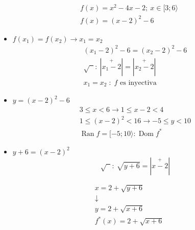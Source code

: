 \documentclass[11pt,a4paper]{article}
\begin{document}
\begin{minipage}[t]{0.380\textwidth}\small
\begin{gather*}
f(x) = x^2 - 4x - 2;\ x \in [3; 6\rangle\\
f(x) = (x-2)^2 - 6
\end{gather*}
\begin{itemize}
  \item $f(x_1) = f(x_2) \rightarrow x_1 = x_2$
  \begin{gather*}
  (x_1 - 2)^2 - 6 = (x_2 - 2)^2 - 6\\
  \sqrt{\phantom{x}}:\ |\overset{+}{x_1 - 2}| = |\overset{+}{x_2 - 2}|\\
  x_1 = x_2 \;:\; f \text{ es inyectiva}
  \end{gather*}
\end{itemize}
\begin{center}
\end{center}
\end{minipage}\hfill
\begin{minipage}[t]{0.330\textwidth}\small
\begin{itemize}
  \item $y = (x-2)^2 - 6$
  \begin{gather*}
  3 \leq x < 6 \rightarrow 1 \leq x - 2 < 4\\
  1 \leq (x-2)^2 < 16 \rightarrow -5 \leq y < 10\\
  \operatorname{Ran}f = [-5; 10\rangle : \operatorname{Dom}f^*
  \end{gather*}
  \item $y + 6 = (x - 2)^2$
  \[\sqrt{\phantom{x}}:\ \sqrt{y + 6} = |\overset{+}{x - 2}|\]
\end{itemize}
\end{minipage}\hfill
\begin{minipage}[t]{0.250\textwidth}
\begin{gather*}
x = 2 + \sqrt{y + 6}\\
\downarrow\\
y = 2 + \sqrt{x + 6}\\[6pt]
f^*(x) = 2 + \sqrt{x + 6}
\end{gather*}
\end{minipage}
\end{document}

